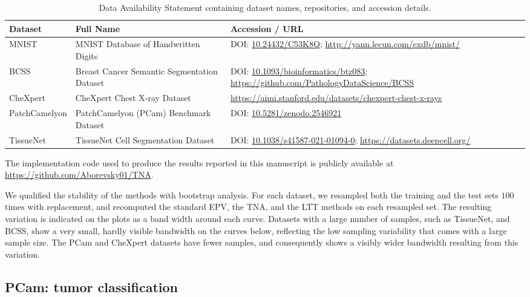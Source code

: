 \documentclass[10pt,letterpaper]{article}
\begin{document}
\begin{table}[ht]
\centering
\small %
\caption{Data Availability Statement containing dataset names, repositories, and accession details.}
\label{tab:data_availability}
\begin{tabularx}{\textwidth}{@{}l>{\raggedright\arraybackslash}X>{\raggedright\arraybackslash}X@{}}
\toprule
\textbf{Dataset} & \textbf{Full Name} & \textbf{Accession / URL} \\
\midrule
MNIST & MNIST Database of Handwritten Digits &  DOI: \href{https://doi.org/10.24432/C53K8Q}{10.24432/C53K8Q}; \url{http://yann.lecun.com/exdb/mnist/} \\
\addlinespace
BCSS & Breast Cancer Semantic Segmentation Dataset &DOI: \href{https://doi.org/10.1093/bioinformatics/btz083}{10.1093/bioinformatics/btz083}; \url{https://github.com/PathologyDataScience/BCSS} \\
\addlinespace
CheXpert & CheXpert Chest X-ray Dataset & \url{https://aimi.stanford.edu/datasets/chexpert-chest-x-rays} \\
\addlinespace
PatchCamelyon & PatchCamelyon (PCam) Benchmark Dataset & DOI: \href{https://doi.org/10.5281/zenodo.2546921}{10.5281/zenodo.2546921} \\
\addlinespace
TissueNet & TissueNet Cell Segmentation Dataset & DOI: \href{https://doi.org/10.1038/s41587-021-01094-0}{10.1038/s41587-021-01094-0}; \url{https://datasets.deepcell.org/} \\
\bottomrule
\end{tabularx}
\end{table}

The implementation code used to produce the results reported in this manuscript is publicly available at \url{https://github.com/Aborevsky01/TNA}.

We qualified the stability of the methods with bootstrap analysis. For each dataset, we resampled both the training and the test sets $100$ times with replacement, and recomputed the standard EPV, the TNA, and the LTT methods on each resampled set. The resulting variation is indicated on the plots as a band width around each curve. Datasets with a large number of samples, such as TissueNet, and BCSS, show a very small, hardly visible bandwidth on the curves below, reflecting the low sampling variability that comes with a large sample size. The PCam and CheXpert datasets have fewer samples, and consequently shows a visibly wider bandwidth resulting from this variation.

\subsection*{PCam: tumor classification}
\end{document}
